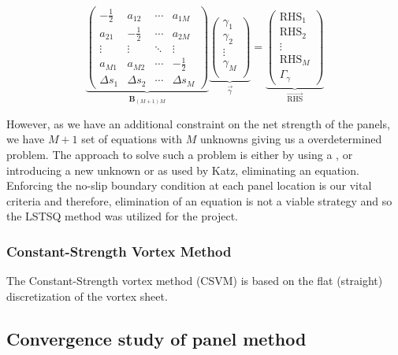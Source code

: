 	\begin{equation}
	\underbrace{\begin{pmatrix}
	-\frac{1}{2} & a_{12} & \cdots & a_{1M}\\ 
	a_{21} & -\frac{1}{2} & \cdots & a_{2M}\\
	\vdots & \vdots & \ddots & \vdots\\ 
	a_{M1} & a_{M2} & \cdots & -\frac{1}{2}\\
	\Delta s_1 & \Delta s_2 & \cdots & \Delta s_M
	\end{pmatrix}}_{\mathbf{B}_{\left(M+1\right)M}} \underbrace{\begin{pmatrix}
	\gamma_{1}\\ \gamma_{2}\\
	\vdots\\
	\gamma_M\\
	\end{pmatrix}}_{\vec{\gamma}} = \underbrace{\begin{pmatrix}
	\mathrm{RHS}_1\\ 
	\mathrm{RHS}_2\\ 
	\vdots\\
	\mathrm{RHS}_M\\
	\Gamma_{\gamma}
	\end{pmatrix}}_{\overrightarrow{\mathrm{RHS}}}
	\end{equation}

However, as we have an additional constraint on the net strength of the panels, we have $M+1$ set of equations with $M$ unknowns giving us a overdetermined problem. The approach to solve such a problem is either by using a , or introducing a new unknown or as used by Katz, eliminating an equation. Enforcing the no-slip boundary condition at each panel location is our vital criteria and therefore, elimination of an equation is not a viable strategy and so the LSTSQ method was utilized for the project.

\subsubsection{Constant-Strength Vortex Method}

The Constant-Strength vortex method ({\color{darkblue}CSVM}) is based on the flat (straight) discretization of the vortex sheet. 

%
\subsection{Convergence study of panel method}
%
